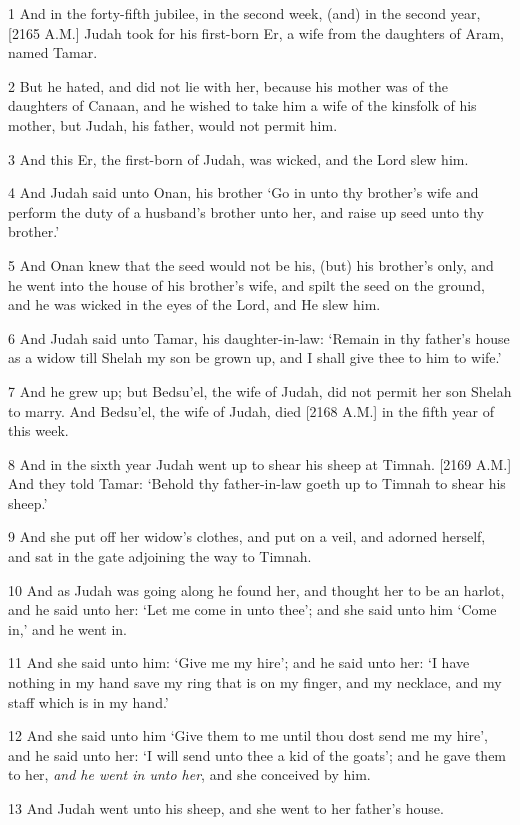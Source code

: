 \par 1 And in the forty-fifth jubilee, in the second week, (and) in the second year, [2165 A.M.] Judah took for his first-born Er, a wife from the daughters of Aram, named Tamar.
\par 2 But he hated, and did not lie with her, because his mother was of the daughters of Canaan, and he wished to take him a wife of the kinsfolk of his mother, but Judah, his father, would not permit him.
\par 3 And this Er, the first-born of Judah, was wicked, and the Lord slew him.
\par 4 And Judah said unto Onan, his brother ‘Go in unto thy brother's wife and perform the duty of a husband's brother unto her, and raise up seed unto thy brother.’
\par 5 And Onan knew that the seed would not be his, (but) his brother's only, and he went into the house of his brother's wife, and spilt the seed on the ground, and he was wicked in the eyes of the Lord, and He slew him.
\par 6 And Judah said unto Tamar, his daughter-in-law: ‘Remain in thy father's house as a widow till Shelah my son be grown up, and I shall give thee to him to wife.’
\par 7 And he grew up; but Bedsu'el, the wife of Judah, did not permit her son Shelah to marry. And Bedsu'el, the wife of Judah, died [2168 A.M.] in the fifth year of this week.
\par 8 And in the sixth year Judah went up to shear his sheep at Timnah. [2169 A.M.] And they told Tamar: ‘Behold thy father-in-law goeth up to Timnah to shear his sheep.’
\par 9 And she put off her widow's clothes, and put on a veil, and adorned herself, and sat in the gate adjoining the way to Timnah.
\par 10 And as Judah was going along he found her, and thought her to be an harlot, and he said unto her: ‘Let me come in unto thee’; and she said unto him ‘Come in,’ and he went in.
\par 11 And she said unto him: ‘Give me my hire’; and he said unto her: ‘I have nothing in my hand save my ring that is on my finger, and my necklace, and my staff which is in my hand.’
\par 12 And she said unto him ‘Give them to me until thou dost send me my hire’, and he said unto her: ‘I will send unto thee a kid of the goats’; and he gave them to her, \textit{and he went in unto her}, and she conceived by him.
\par 13 And Judah went unto his sheep, and she went to her father's house.
